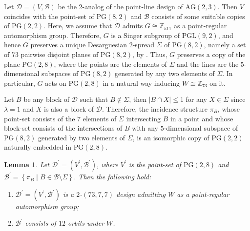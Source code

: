 \documentclass[a4paper, 11pt]{article}
\newtheorem{lemma}[theorem]{Lemma}
\theoremstyle{definition}
\theoremstyle{definition}
\theoremstyle{definition}
\numberwithin{equation}{section}
\begin{document}
Let $\mathcal{D}=(V,\mathcal{B})$ be the $2$-analog of the point-line design of $\mathrm{AG}(2,3)$. Then $V$ coincides with the point-set of $\mathrm{PG}(8,2)$ and $\mathcal{B}$ consists of some suitable copies of $\mathrm{PG}(2,2)$. Here, we assume that $%
\mathcal{D}$ admits $G\cong \mathbb{Z}_{511}$ as a point-regular automorphism
group. Therefore, $G$ is a Singer subgroup of $\mathrm{PGL}(9,2)$, and hence $G$
preserves a unique Desarguesian $2$-spread $\Sigma $ of $\mathrm{PG}(8,2)$, namely
a set of $73$ pairwise disjoint planes of $\mathrm{PG}(8,2)$, by \cite[Lemma 2.1]%
{Dru}. Thus, $G$ preserves a copy of the plane $\mathrm{PG}(2,8)$, where the
points are the elements of $\Sigma $ and the lines are the $5$-dimensional subspaces of $\mathrm{PG}(8,2)$ generated by any two elements of $\Sigma$. In particular, $G$
acts on $\mathrm{PG}(2,8)$ in a natural way inducing $W\cong \mathbb{Z}_{73}$ on it.


Let $B$ be any block of $\mathcal{D}$ such that $B\notin \Sigma $, then $%
\left\vert B\cap X\right\vert \leq 1$ for any $X\in \Sigma $ since $\lambda =1$ and $X$ is also a
block of $\mathcal{D}$. Therefore, the incidence
structure $\pi _{B}$, whose point-set consists of the $7$ elements of 
$\Sigma$ intersecting $B$ in a point and whose block-set consists of the
intersections of $B$ with any $5$-dimensional subspace of $\mathrm{PG}(8,2)$
generated by two elements of $\Sigma$, is an isomorphic copy of $\mathrm{PG}(2,2)$ naturally embedded in $\mathrm{PG}(2,8)$.

 

\begin{lemma}
	\label{LemJedan}Let $\mathcal{D}^{\prime }=(V^{\prime },\mathcal{B}^{\prime })$, where $V^{\prime }$
	is the point-set of $\mathrm{PG}(2,8)$ and $\mathcal{B}^{\prime }=\left\{ \pi
	_{B} \mid B\in \mathcal{B}\setminus \Sigma \right\} $. Then the following hold:
	
	\begin{enumerate}
		\item $\mathcal{D}^{\prime }=(V^{\prime },\mathcal{B}^{\prime })$
		is a $2$-$(73,7,7)$ design admitting $W$ as a point-regular automorphism
		group;
		
		\item $\mathcal{B}^{\prime }$ consists of $12$ orbits under $W$.
	\end{enumerate}
\end{lemma}
\end{document}
